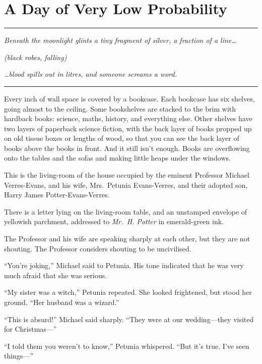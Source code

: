 \chapter{A Day of Very Low
Probability}\label{a-day-of-very-low-probability}

\begin{center}\rule{3in}{0.4pt}\end{center}

\emph{Beneath the moonlight glints a tiny fragment of silver, a fraction
of a line\ldots{}}

\emph{(black robes, falling)}

\emph{\ldots{}blood spills out in litres, and someone screams a word.}

\begin{center}\rule{3in}{0.4pt}\end{center}

Every inch of wall space is covered by a bookcase. Each bookcase has six
shelves, going almost to the ceiling. Some bookshelves are stacked to
the brim with hardback books: science, maths, history, and everything
else. Other shelves have two layers of paperback science fiction, with
the back layer of books propped up on old tissue boxes or lengths of
wood, so that you can see the back layer of books above the books in
front. And it still isn't enough. Books are overflowing onto the tables
and the sofas and making little heaps under the windows.

This is the living-room of the house occupied by the eminent Professor
Michael Verres-Evans, and his wife, Mrs.~Petunia Evans-Verres, and their
adopted son, Harry James Potter-Evans-Verres.

There is a letter lying on the living-room table, and an unstamped
envelope of yellowish parchment, addressed to \emph{Mr.~H. Potter} in
emerald-green ink.

The Professor and his wife are speaking sharply at each other, but they
are not shouting. The Professor considers shouting to be uncivilised.

``You're joking,'' Michael said to Petunia. His tone indicated that he
was very much afraid that she was serious.

``My sister was a witch,'' Petunia repeated. She looked frightened, but
stood her ground. ``Her husband was a wizard.''

``This is absurd!'' Michael said sharply. ``They were at our
wedding---they visited for Christmas---''

``I told them you weren't to know,'' Petunia whispered. ``But it's true.
I've seen things---''

